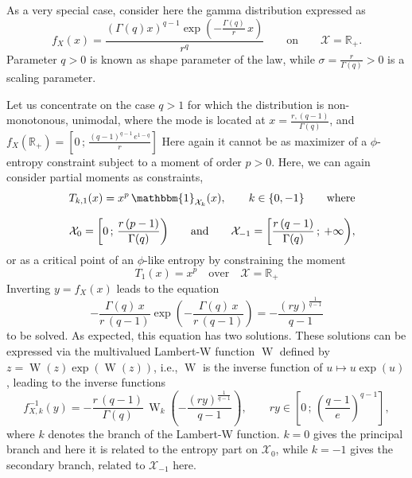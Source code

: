 \documentclass[entropy,article,submit,moreauthors,pdftex]{Definitions/mdpi}
\newcommand{\SZ}[1]{{\color{blue} #1}}                                       %
\def\Rset{\mathbb{R}}%
\def\X{\mathcal{X}}%
\def\un{\mathbbm{1}}%
\def\W{\operatorname{W}} %
\begin{document}
As a very special case, consider here the gamma distribution expressed as
%
\SZ{
\[
f_X(x) = \frac{\left( \Gamma(q)  x \right)^{q-1} \exp\left(- \frac{\Gamma(q)}{r}
  \, x \right)}{r^q} \qquad \mbox{on} \qquad \X = \Rset_+.
\]
%
Parameter  $q >  0$ is  known as  shape parameter  of the  law, while  $\sigma =
\frac{r}{\Gamma(q)} > 0$ is a scaling parameter.}

Let  us  concentrate  on  the  case  $q >  1$  for  which  the  distribution  is
non-monotonous,  unimodal, where  the  mode is  located at  \SZ{$x  = \frac{r  ,
    (q-1)}{\Gamma(q)}$, and $f_X(\Rset_+)  = \left[ 0 \,  ; \, \frac{(q-1)^{q-1}
      \, e^{1-q}}{r} \right]$
}
%
Here again it cannot be \SZ{as  maximizer of a $\phi$-entropy constraint subject
  to  a moment  of order  $p >  0$}.  Here,  we can  again \SZ{consider  partial
  moments as constraints,
  \SZ{
\begin{eqnarray*}
&&  T_{k,1}(x) =  x^p  \,  \un_{\X_k}(x), \qquad  k  \in \{  0  ,  -1 \}  \qquad
  \mbox{where} \\[2.5mm] && \X_0 = \left[ 0 \, ; \, \frac{r \, (p-1)}{\Gamma(q)}
    \right)   \qquad   \mbox{and}   \qquad   \X_{-1}   =   \left[   \frac{r   \,
        (q-1)}{\Gamma(q)} \, ; \: +\infty \right),
\end{eqnarray*}
%
}
or as a critical point of an $\phi$-like entropy by constraining} the moment 
%
\[
T_1(x) = x^p \quad \mbox{over} \quad \X = \Rset_+
\]
%
Inverting $y = f_X(x)$ leads to the equation
%
\SZ{
\[
- \frac{\Gamma(q) \, x}{r \, (q-1)}  \exp\left( -  \frac{\Gamma(q) \, x}{r \, (q-1)}  \right) =  -
       \frac{\left( r y \right)^{\frac{1}{q-1}}}{q-1}
\]
}
%
to be solved. As expected, this  equation has two solutions. These solutions can
be  expressed   via  the   multivalued  Lambert-W   function  $\W$   defined  by
$z=\W(z)\exp(\W(z))$,  i.e., $\W$  is  the  inverse function  of  $u \mapsto  u
\exp(u)$\cite[\S~1]{CorGon96}, leading to the inverse functions
%
\SZ{
\[
f_{X,k}^{-1}(y) = -  \frac{r \, (q-1)}{\Gamma(q)} \, \W_k\left(       - \frac{\left( r y \right)^{\frac{1}{q-1}}}{q-1}
\right)
,  \qquad r y \in  \left[ 0 \, ;  \, \left( \frac{q-1}{e} \right)^{q-1}
  \right],
\]
}
%
where  $k$  denotes the  branch  of  the  Lambert-W  function. $k=0$  gives  the
principal branch and here it is related  to the entropy part on $\X_0$, while $k
= -1$ gives the secondary branch, related to $\X_{-1}$ here.
\end{document}
